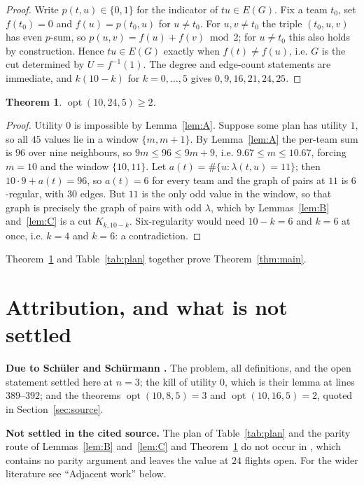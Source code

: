 \documentclass[11pt]{amsart}
\newtheorem{theorem}{Theorem}
\theoremstyle{remark}
\newcommand{\opt}{\operatorname{opt}}
\begin{document}
\begin{proof}
Write $p(t,u)\in\{0,1\}$ for the indicator of $tu\in E(G)$. Fix a team $t_0$,
set $f(t_0)=0$ and $f(u)=p(t_0,u)$ for $u\ne t_0$. For $u,v\ne t_0$ the triple
$(t_0,u,v)$ has even $p$-sum, so $p(u,v)=f(u)+f(v)\bmod2$; for $u\ne t_0$ this
also holds by construction. Hence $tu\in E(G)$ exactly when $f(t)\ne f(u)$,
i.e. $G$ is the cut determined by $U=f^{-1}(1)$. The degree and edge-count
statements are immediate, and $k(10-k)$ for $k=0,\dots,5$ gives
$0,9,16,21,24,25$.
\end{proof}

\begin{theorem}\label{thm:lower}
$\opt(10,24,5)\ge2$.
\end{theorem}

\begin{proof}
Utility $0$ is impossible by Lemma~\ref{lem:A}. Suppose some plan has utility
$1$, so all $45$ values lie in a window $\{m,m+1\}$. By Lemma~\ref{lem:A} the
per-team sum is $96$ over nine neighbours, so $9m\le96\le9m+9$, i.e.
$9.67\le m\le10.67$, forcing $m=10$ and the window $\{10,11\}$. Let
$a(t)=\#\{u:\lambda(t,u)=11\}$; then $10\cdot9+a(t)=96$, so $a(t)=6$ for every
team and the graph of pairs at $11$ is $6$-regular, with $30$ edges. But $11$
is the only odd value in the window, so that graph is precisely the graph of
pairs with odd $\lambda$, which by Lemmas~\ref{lem:B} and~\ref{lem:C} is a cut
$K_{k,10-k}$. Six-regularity would need $10-k=6$ and $k=6$ at once, i.e. $k=4$
and $k=6$: a contradiction.
\end{proof}

Theorem~\ref{thm:lower} and Table~\ref{tab:plan} together prove
Theorem~\ref{thm:main}.

\section{Attribution, and what is not settled}\label{sec:scope}

\noindent\textbf{Due to Sch\"uler and Sch\"urmann \cite{SchuelerSchuermann}.}
The problem, all definitions, and the open statement settled here at $n=3$;
the kill of utility $0$, which is their lemma at lines
$389$--$392$; and the theorems $\opt(10,8,5)=3$ and $\opt(10,16,5)=2$, quoted in
Section~\ref{sec:source}.

\noindent\textbf{Not settled in the cited source.} The plan of
Table~\ref{tab:plan} and the parity route of Lemmas~\ref{lem:B}
and~\ref{lem:C} and Theorem~\ref{thm:lower} do not occur in
\cite{SchuelerSchuermann}, which contains no parity argument and leaves the
value at $24$ flights open. For the wider literature see ``Adjacent work''
below.
\end{document}
